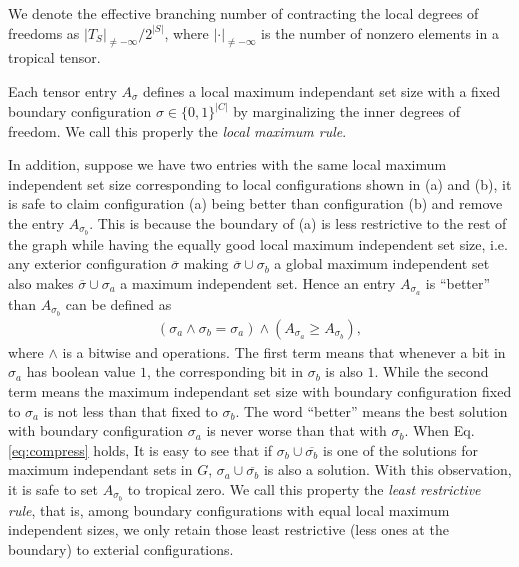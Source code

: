 \documentclass{article}
\newcommand{\<}{\langle}
\renewcommand{\>}{\rangle}
\theoremstyle{definition}\newtheorem{definition}{\textit{Definition}}
\begin{document}
We denote the effective branching number of contracting the local degrees of freedoms as $|T_S|_{\neq -\infty}/2^{|S|}$, where $|\cdot|_{\neq -\infty}$ is the number of nonzero elements in a tropical tensor.

Each tensor entry $A_{\sigma}$ defines a local maximum independant set size with a fixed boundary configuration $\sigma \in \{0,1\}^{|C|}$ by marginalizing the inner degrees of freedom.
We call this properly the \textit{local maximum rule}.

In addition, suppose we have two entries with the same local maximum independent set size corresponding to local configurations shown in (a) and (b), it is safe to claim configuration (a) being better than configuration (b) and remove the entry $A_{\sigma_b}$.
This is because the boundary of (a) is less restrictive to the rest of the graph while having the equally good local maximum independent set size, 
i.e. any exterior configuration $\overline{\sigma}$ making $\overline{\sigma} \cup \sigma_b$ a global maximum independent set also makes $\overline{\sigma} \cup \sigma_a$ a maximum independent set.
Hence an entry $A_{\sigma_a}$ is ``better'' than $A_{\sigma_b}$ can be defined as
\begin{align}
(\sigma_a \land \sigma_b = \sigma_a) \land (A_{\sigma_a} \geq A_{\sigma_b}),\label{eq:compress}
\end{align}
where $\land$ is a bitwise and operations.
The first term means that whenever a bit in $\sigma_a$ has boolean value $1$, the corresponding bit in $\sigma_b$ is also $1$.
While the second term means the maximum independant set size with boundary configuration fixed to $\sigma_a$ is not less than that fixed to $\sigma_b$.
The word ``better'' means the best solution with boundary configuration $\sigma_a$ is never worse than that with $\sigma_b$.
When Eq. \ref{eq:compress} holds, It is easy to see that if $\sigma_b \cup \overline{\sigma_b}$ is one of the solutions for maximum independant sets in $G$, $\sigma_a \cup \overline{\sigma_b}$ is also a solution.
With this observation, it is safe to set $A_{\sigma_b}$ to tropical zero.
We call this property the \textit{least restrictive rule}, that is,
among boundary configurations with equal local maximum independent sizes,
we only retain those least restrictive (less ones at the boundary) to exterial configurations.
\end{document}

